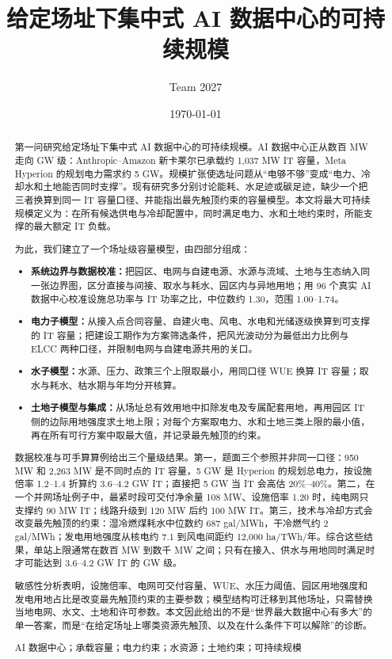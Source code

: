 \documentclass{mcmthesis}
\title{给定场址下集中式 AI 数据中心的可持续规模}
\author{\small Team 2027}
\date{\today}
\begin{document}
\begin{abstract}
第一问研究给定场址下集中式 AI 数据中心的可持续规模。AI 数据中心正从数百 MW 走向 GW 级：Anthropic--Amazon 新卡莱尔已承载约 1,037 MW IT 容量，Meta Hyperion 的规划电力需求约 5 GW。规模扩张使选址问题从“电够不够”变成“电力、冷却水和土地能否同时支撑”。现有研究多分别讨论能耗、水足迹或碳足迹，缺少一个把三者换算到同一 IT 容量口径、并能指出最先触顶约束的容量模型。本文将最大可持续规模定义为：在所有候选供电与冷却配置中，同时满足电力、水和土地约束时，所能支撑的最大额定 IT 负载。

为此，我们建立了一个场址级容量模型，由四部分组成：
\begin{itemize}
\item \textbf{系统边界与数据校准：}把园区、电网与自建电源、水源与流域、土地与生态纳入同一张边界图，区分直接与间接、取水与耗水、园区内与异地用地；用 96 个真实 AI 数据中心校准设施总功率与 IT 功率之比，中位数约 1.30，范围 1.00--1.74。
\item \textbf{电力子模型：}从接入点合同容量、自建火电、风电、水电和光储逐级换算到可支撑的 IT 容量；把建设工期作为方案筛选条件，把风光波动分为最低出力比例与 ELCC 两种口径，并限制电网与自建电源共用的关口。
\item \textbf{水子模型：}水源、压力、政策三个上限取最小，用同口径 WUE 换算 IT 容量；取水与耗水、枯水期与年均分开核算。
\item \textbf{土地子模型与集成：}从场址总有效用地中扣除发电及专属配套用地，再用园区 IT 侧的边际用地强度求土地上限；对每个方案取电力、水和土地三类上限的最小值，再在所有可行方案中取最大值，并记录最先触顶的约束。
\end{itemize}

数据校准与可手算算例给出三个量级结果。第一，题面三个参照并非同一口径：950 MW 和 2,263 MW 是不同时点的 IT 容量，5 GW 是 Hyperion 的规划总电力，按设施倍率 1.2--1.4 折算约 3.6--4.2 GW IT；直接把 5 GW 当 IT 会高估 20\%--40\%。第二，在一个并网场址例子中，最紧时段可交付净余量 108 MW、设施倍率 1.20 时，纯电网只支撑约 90 MW IT；线路升级到 120 MW 后约 100 MW IT。第三，技术与冷却方式会改变最先触顶的约束：湿冷燃煤耗水中位数约 687 gal/MWh，干冷燃气约 2 gal/MWh；发电用地强度从核电约 7.1 到风电间距约 12,000 ha/TWh/年。综合这些结果，单站上限通常在数百 MW 到数千 MW 之间；只有在接入、供水与用地同时满足时才可能达到 3.6--4.2 GW IT 的 GW 级。

敏感性分析表明，设施倍率、电网可交付容量、WUE、水压力阈值、园区用地强度和发电用地占比是改变最先触顶约束的主要参数；模型结构可迁移到其他场址，只需替换当地电网、水文、土地和许可参数。本文因此给出的不是“世界最大数据中心有多大”的单一答案，而是“在给定场址上哪类资源先触顶、以及在什么条件下可以解除”的诊断。

\begin{keywords}
AI 数据中心；承载容量；电力约束；水资源；土地约束；可持续规模
\end{keywords}
\end{abstract}
\end{document}
